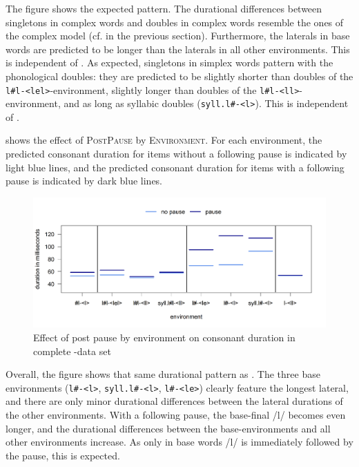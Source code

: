  The figure shows the expected pattern. The durational differences between singletons in complex words and doubles in complex words resemble the ones of the complex model (cf.  in the previous section). 
 Furthermore, the laterals in base words are predicted to be longer than the laterals in all other environments. This is independent of . 
 As expected, singletons in simplex words pattern with the phonological doubles: they are predicted to be slightly shorter than doubles of the \texttt{l\#l-<lel>}-environment, slightly longer than doubles of the \texttt{l\#l-<ll>}-environment, and as long as syllabic doubles (\texttt{syll.l\#-<l>}). This is independent of .
 
 
 
  shows the effect of \textsc{PostPause} by \textsc{Environment}. For each environment, the predicted consonant duration for items without a following pause is indicated by light blue lines, and the predicted consonant duration for  items with a following pause is indicated by dark blue lines.

 \begin{figure}
 	

 	\includegraphics [scale=0.48] {images/Experiment/LyModelCompleteInterEnvPauseLines}

 	\caption{Effect of  post pause by environment on consonant duration in complete -data set}
 	\label{fig:Env pause lyComplete experiment}

 \end{figure}
 

 Overall, the figure shows that same durational pattern as . The three base environments (\texttt{l\#-<l>}, \texttt{syll.l\#-<l>}, \texttt{l\#-<le>}) clearly feature the longest lateral, and there are only minor durational differences between the lateral durations of the other environments. 
 With a following pause, the base-final /l/ becomes even longer, and the durational differences between the base-environments and all other environments increase. As only in base words /l/ is immediately followed by the pause, this is expected. 



